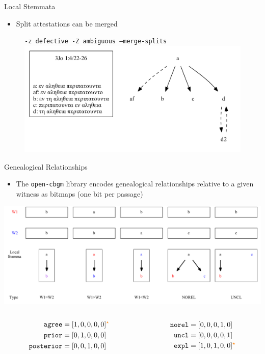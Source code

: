 \documentclass[10pt]{beamer}
\begin{document}
	\begin{frame}{Local Stemmata}
		\begin{itemize}
			\item Split attestations can be merged
		\end{itemize}
		\begin{figure}
			\centering
			\texttt{-z defective -Z ambiguous --merge-splits}
			\includegraphics[width=\textwidth]{../graphics/B25K1V4U22-26-local-stemma-ignore-defective-drop-ambiguous-merge-splits.pdf}
		\end{figure}
	\end{frame}
	\begin{frame}{Genealogical Relationships}
		\begin{itemize}
			\item The \texttt{open-cbgm} library encodes genealogical relationships relative to a given witness as bitmaps (one bit per passage)
		\end{itemize}
		\includegraphics[width=\textwidth]{../graphics/genealogical-relationships.pdf}
		\begin{columns}
			\begin{column}{0.5\textwidth}
				\begin{align*}
					\mathtt{agree} &= [1,0,0,0,0]^{\color{orange}\star}\\
					\mathtt{prior} &= [0,1,0,0,0]\\
					\mathtt{posterior} &= [0,0,1,0,0]
				\end{align*}
			\end{column}
			\begin{column}{0.5\textwidth}
				\begin{align*}
					\mathtt{norel} &= [0,0,0,1,0]\\
					\mathtt{uncl} &= [0,0,0,0,1]\\
					\mathtt{expl} &= [1,0,1,0,0]^{\color{orange}\star}
				\end{align*}
			\end{column}
		\end{columns}
	\end{frame}
\end{document}
